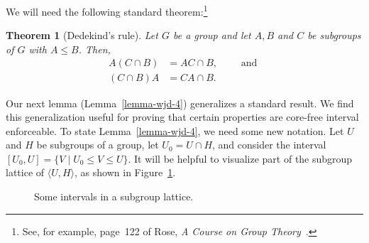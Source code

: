 \documentclass[11pt]{amsart}
\theoremstyle{plain}
\newtheorem{theorem}{Theorem}[section]
\theoremstyle{definition}
\theoremstyle{remark}
\numberwithin{theorem}{section}
\numberwithin{claim}{section}
\numberwithin{equation}{section}
\numberwithin{conjecture}{section}
\newcommand{\<}{\ensuremath{\langle}}
\renewcommand{\>}{\ensuremath{\rangle}}
\renewcommand{\leq}{\ensuremath{\leqslant}}
\newcommand{\0}{\ensuremath{\mathbf{0}}}
\newcommand{\1}{\ensuremath{\mathbf{1}}}
\newcommand{\2}{\ensuremath{\mathbf{2}}}
\newcommand{\3}{\ensuremath{\mathbf{3}}}
\newcommand{\4}{\ensuremath{\mathbf{4}}}
\newcommand{\5}{\ensuremath{\mathbf{5}}}
\newcommand{\dotsize}{.8pt}
\begin{document}
We will need the following standard theorem:\footnote{See, for example, page~122
  of Rose, \emph{A Course on Group Theory}~\cite{Rose:1978}.} 
\begin{theorem}[Dedekind's rule]
  \label{lemma-dedekind}
Let $G$ be a group and let $A, B$ and $C$ be subgroups of $G$ with $A\leq B$.  Then,
\begin{align}
\label{eq:dedekind1}
A(C\cap B) &= AC \cap B,\qquad \text{ and }\\
\label{eq:dedekind2}
(C\cap B)A &= CA \cap B.
\end{align}
\end{theorem}

Our next lemma (Lemma~\ref{lemma-wjd-4}) generalizes a standard
result.  We find this generalization useful for proving that certain properties are
core-free interval enforceable.
To state Lemma~\ref{lemma-wjd-4}, we need some new notation.  
Let $U$ and $H$ be subgroups of a group,
let $U_0 = U\cap H$, and consider the interval $[U_0, U]=\{ V \mid U_0 \leq V
\leq U\}$.   
It will be helpful to visualize part of the subgroup lattice of
$\<U,H\>$, as shown in Figure~\ref{fig:intervals}.


\begin{figure}[!h]
\begin{center}
\end{center}
  \caption{Some intervals in a subgroup lattice.}
  \label{fig:intervals}
\end{figure}
\end{document}
